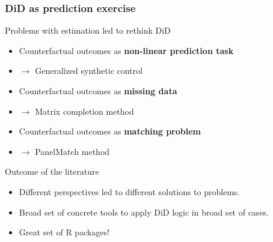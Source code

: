 \documentclass[12pt,aspectratio=169]{beamer}\usepackage[]{graphicx}\usepackage[]{xcolor}
\begin{document}
\begin{frame}
\frametitle{DiD as prediction exercise}

    \begin{alertblock}{Problems with estimation led to rethink DiD}

    \begin{itemize}[itemsep=0em, topsep=0pt]
    \small
        \item Counterfactual outcomes as \textbf{non-linear prediction task}
        \item $\rightarrow$ Generalized synthetic control
        \item Counterfactual outcomes as \textbf{missing data}
        \item $\rightarrow$ Matrix completion method
        \item Counterfactual outcomes as \textbf{matching problem}
        \item $\rightarrow$ PanelMatch method
    \end{itemize}

    \end{alertblock}

    \begin{alertblock}{Outcome of the literature}

    \begin{itemize}[itemsep=0em, topsep=0pt]
    \small
        \item Different perspectives led to different solutions to problems.
        \item Broad set of concrete tools to apply DiD logic in broad set of cases.
        \item Great set of R packages!
    \end{itemize}

    \end{alertblock}

\end{frame}
\end{document}
